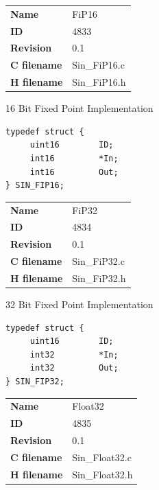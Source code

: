\ifdefined \AddTestReports
{}
\fi
{}
\nopagebreak[0]
\begin{tabular}{l l}
\textbf{Name} & FiP16 \tabularnewline
\textbf{ID} & 4833 \tabularnewline
\textbf{Revision} & 0.1 \tabularnewline
\textbf{C filename} & Sin\_FiP16.c \tabularnewline
\textbf{H filename} & Sin\_FiP16.h \tabularnewline
\end{tabular}
\vspace{1ex}

16 Bit Fixed Point Implementation

\begin{lstlisting}
typedef struct {
     uint16        ID;
     int16         *In;
     int16         Out;
} SIN_FIP16;
\end{lstlisting}

\ifdefined \AddTestReports
{}
\fi
{}
\nopagebreak[0]
\begin{tabular}{l l}
\textbf{Name} & FiP32 \tabularnewline
\textbf{ID} & 4834 \tabularnewline
\textbf{Revision} & 0.1 \tabularnewline
\textbf{C filename} & Sin\_FiP32.c \tabularnewline
\textbf{H filename} & Sin\_FiP32.h \tabularnewline
\end{tabular}
\vspace{1ex}

32 Bit Fixed Point Implementation

\begin{lstlisting}
typedef struct {
     uint16        ID;
     int32         *In;
     int32         Out;
} SIN_FIP32;
\end{lstlisting}

\ifdefined \AddTestReports
{}
\fi
{}
\nopagebreak[0]
\begin{tabular}{l l}
\textbf{Name} & Float32 \tabularnewline
\textbf{ID} & 4835 \tabularnewline
\textbf{Revision} & 0.1 \tabularnewline
\textbf{C filename} & Sin\_Float32.c \tabularnewline
\textbf{H filename} & Sin\_Float32.h \tabularnewline
\end{tabular}
\vspace{1ex}


